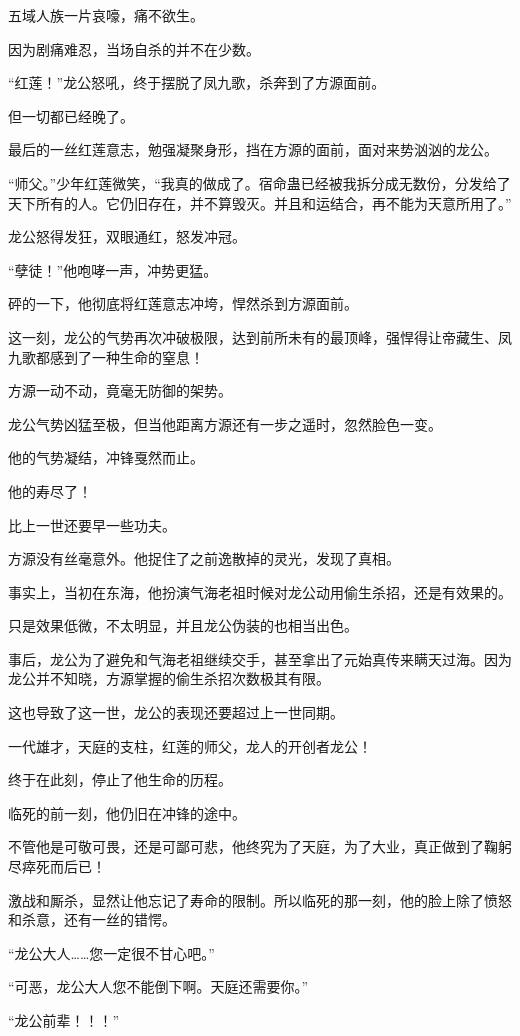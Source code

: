 \begin{this_body}
五域人族一片哀嚎，痛不欲生。

因为剧痛难忍，当场自杀的并不在少数。

“红莲！”龙公怒吼，终于摆脱了凤九歌，杀奔到了方源面前。

但一切都已经晚了。

最后的一丝红莲意志，勉强凝聚身形，挡在方源的面前，面对来势汹汹的龙公。

“师父。”少年红莲微笑，“我真的做成了。宿命蛊已经被我拆分成无数份，分发给了天下所有的人。它仍旧存在，并不算毁灭。并且和运结合，再不能为天意所用了。”

龙公怒得发狂，双眼通红，怒发冲冠。

“孽徒！”他咆哮一声，冲势更猛。

砰的一下，他彻底将红莲意志冲垮，悍然杀到方源面前。

这一刻，龙公的气势再次冲破极限，达到前所未有的最顶峰，强悍得让帝藏生、凤九歌都感到了一种生命的窒息！

方源一动不动，竟毫无防御的架势。

龙公气势凶猛至极，但当他距离方源还有一步之遥时，忽然脸色一变。

他的气势凝结，冲锋戛然而止。

他的寿尽了！

比上一世还要早一些功夫。

方源没有丝毫意外。他捉住了之前逸散掉的灵光，发现了真相。

事实上，当初在东海，他扮演气海老祖时候对龙公动用偷生杀招，还是有效果的。

只是效果低微，不太明显，并且龙公伪装的也相当出色。

事后，龙公为了避免和气海老祖继续交手，甚至拿出了元始真传来瞒天过海。因为龙公并不知晓，方源掌握的偷生杀招次数极其有限。

这也导致了这一世，龙公的表现还要超过上一世同期。

一代雄才，天庭的支柱，红莲的师父，龙人的开创者龙公！

终于在此刻，停止了他生命的历程。

临死的前一刻，他仍旧在冲锋的途中。

不管他是可敬可畏，还是可鄙可悲，他终究为了天庭，为了大业，真正做到了鞠躬尽瘁死而后已！

激战和厮杀，显然让他忘记了寿命的限制。所以临死的那一刻，他的脸上除了愤怒和杀意，还有一丝的错愕。

“龙公大人……您一定很不甘心吧。”

“可恶，龙公大人您不能倒下啊。天庭还需要你。”

“龙公前辈！！！”


\end{this_body}
